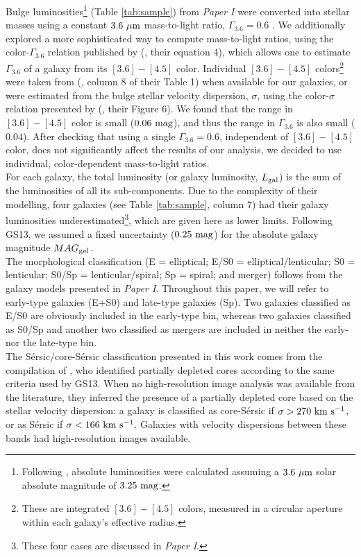 \documentclass[preprint2]{emulateapj}
\begin{document}
Bulge luminosities\footnote{Following \cite{sani2011}, absolute luminosities were calculated 
assuming a $3.6\rm~\mu m$ solar absolute magnitude of $3.25\rm~mag$.} 
(Table \ref{tab:sample}) from \emph{Paper I} were converted into stellar masses 
using a constant $3.6\rm~\mu m$ mass-to-light ratio, $\Gamma_{3.6} = 0.6$ \citep{meidt2014}.
We additionally explored a more sophisticated way to compute mass-to-light ratios, 
using the color-$\Gamma_{3.6}$ relation published by 
\citeauthor{meidt2014} (\citeyear{meidt2014}, their equation 4), 
which allows one to estimate $\Gamma_{3.6}$ of a galaxy from its $[3.6] - [4.5]$ color. 
Individual $[3.6] - [4.5]$ colors\footnote{These are integrated $[3.6] - [4.5]$ colors, measured in a circular aperture 
within each galaxy's effective radius.} were taken from 
\citeauthor{peletier2012} (\citeyear{peletier2012}, column 8 of their Table 1) 
when available for our galaxies, 
or were estimated from the bulge stellar velocity dispersion, $\sigma$, 
using the color-$\sigma$ relation presented by \citeauthor{peletier2012} (\citeyear{peletier2012}, their Figure 6).
We found that the range in $[3.6] - [4.5]$ color is small ($0.06\rm~mag$), 
and thus the range in $\Gamma_{3.6}$ is also small ($0.04$).
After checking that using a single $\Gamma_{3.6} = 0.6$, independent of $[3.6] - [4.5]$ color, 
does not significantly affect the results of our analysis, 
we decided to use individual, color-dependent mass-to-light ratios. \\
For each galaxy, the total luminosity (or galaxy luminosity, $L_{\rm gal}$) is the sum of the luminosities of all its sub-components. 
Due to the complexity of their modelling, 
four galaxies (see Table \ref{tab:sample}, column 7) had their galaxy luminosities 
underestimated\footnote{These four cases are discussed in \emph{Paper I}.}, 
which are given here as lower limits. 
Following GS13, we assumed a fixed uncertainty ($0.25\rm~mag$) for the absolute galaxy magnitude $MAG_{\rm gal}$. \\
The morphological classification (E = elliptical; E/S0 = elliptical/lenticular; S0 = lenticular; S0/Sp = lenticular/spiral; Sp = spiral; and merger) 
follows from the galaxy models presented in \emph{Paper I}. 
Throughout this paper, we will refer to early-type galaxies (E+S0) and late-type galaxies (Sp). 
Two galaxies classified as E/S0 are obviously included in the early-type bin, 
whereas two galaxies classified as S0/Sp and another two classified as mergers are included in neither the early- nor the late-type bin.\\
The S\'ersic/core-S\'ersic classification presented in this work 
comes from the compilation of \citet{savorgnangraham2015},
who identified partially depleted cores according to the same criteria used by GS13.
When no high-resolution image analysis was available from the literature, 
they inferred the presence of a partially depleted core based on the stellar velocity dispersion:
a galaxy is classified as core-S\'ersic if $\sigma > 270\rm~km~s^{-1}$,
or as S\'ersic if $\sigma < 166\rm~km~s^{-1}$. 
Galaxies with velocity dispersions between these bands had high-resolution images available. 
\end{document}
